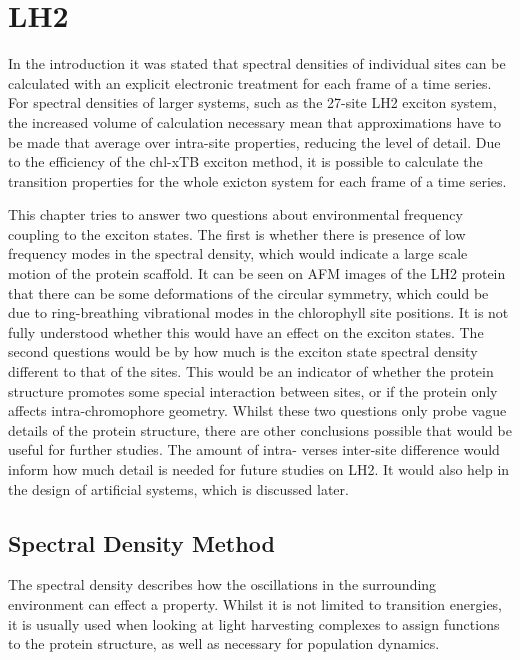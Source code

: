 \section{LH2}
\label{sec:LH2}

In the introduction it was stated that spectral densities of individual sites can
be calculated with an explicit electronic treatment for each frame of a time series.
For spectral densities of larger systems, such as the 27-site LH2 exciton system,
the increased volume of calculation necessary mean that approximations have to be
made that average over intra-site properties, reducing the level of detail. Due 
to the efficiency of the chl-xTB exciton method, it is possible to calculate the
transition properties for the whole exicton system for each frame of a time series.

This chapter tries to answer two questions about environmental frequency coupling
to the exciton states. The first is whether there is presence of low frequency modes
in the spectral density, which would indicate a large scale motion of the protein
scaffold. It can be seen on AFM images of the LH2 protein that there can be some 
deformations of the circular symmetry, which could be due to ring-breathing vibrational
modes in the chlorophyll site positions. It is not fully understood whether this
would have an effect on the exciton states. The second questions would be by how
much is the exciton state spectral density different to that of the sites. This
would be an indicator of whether the protein structure promotes some special interaction 
between sites, or if the protein only affects intra-chromophore geometry. Whilst
these two questions only probe vague details of the protein structure, there are
other conclusions possible that would be useful for further studies. The amount 
of intra- verses inter-site difference would inform how much detail is needed for
future studies on LH2. It would also help in the design of artificial systems, which
is discussed later.

\subsection{Spectral Density Method}
\label{subsec:spec_dens}

The spectral density describes how the oscillations in the surrounding environment 
can effect a property. Whilst it is not limited to transition energies, it is usually
used when looking at light harvesting complexes to assign functions to the protein
structure, as well as necessary for population dynamics.

